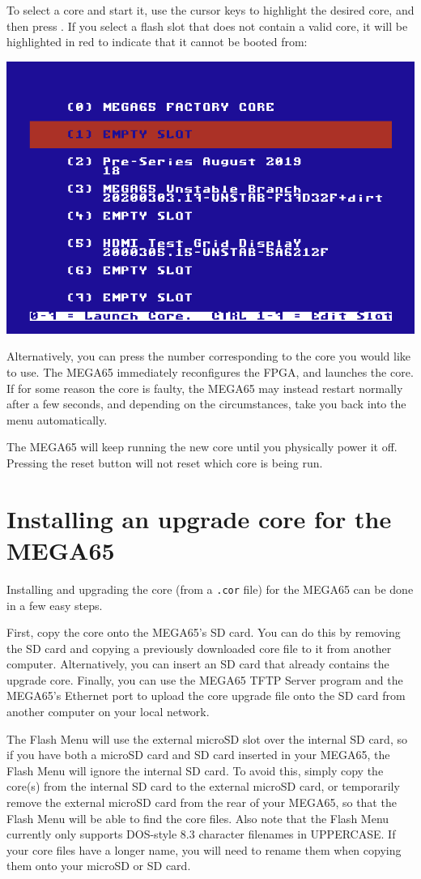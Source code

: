 To select a core and start it, use the cursor keys to highlight the desired core, and then press
.  If you select a flash slot that does not
contain a valid core, it will be highlighted in red to indicate that it
cannot be booted from:

\begin{center}
\includegraphics[trim= 0  0 0 10mm,clip,width=0.7\linewidth]{images/ss-flashmenu-invalidslot.png}
\end{center}

Alternatively, you can press the number corresponding to the core you would
like to use. The MEGA65 immediately reconfigures the FPGA, and launches the core.  If for some reason
the core is faulty, the MEGA65 may instead restart normally after a few seconds, and depending on the
circumstances, take you back into the menu automatically.

The MEGA65 will keep running the new core until you physically power it off.  Pressing the reset button
will not reset which core is being run.

\section{Installing an upgrade core for the MEGA65}

Installing and upgrading the core (from a {\tt .cor} file) for the MEGA65 can be done in a few easy steps.

First, copy the core onto the MEGA65's SD card. You can do this by removing the SD card and copying a previously
downloaded core file to it from another computer. Alternatively,
you can insert an SD card that already contains the upgrade core. Finally, you can use the MEGA65 TFTP Server
program and the MEGA65's Ethernet port to upload the core upgrade file onto the SD card from another computer
on your local network.

The Flash Menu will use the external microSD slot over
the internal SD card, so if you have both a microSD card and SD card
inserted in your MEGA65, the Flash Menu will ignore the
internal SD card. To avoid this, simply copy the core(s) from the internal SD
card to the external microSD card, or temporarily remove the external
microSD card from the rear of your MEGA65, so that the Flash Menu will
be able to find the core files.  Also note that the Flash Menu
currently only supports DOS-style 8.3 character filenames in UPPERCASE. If your
core files have a longer name, you will need to rename them when
copying them onto your microSD or SD card.

